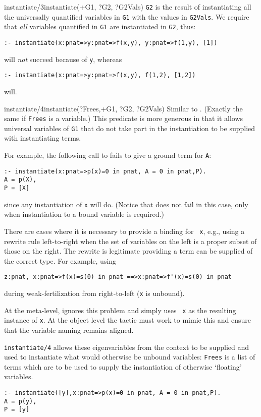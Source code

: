 \begin{predicate}{instantiate/3}{instantiate(+G1, ?G2, ?G2Vals)}%
{\tt G2} is the result of instantiating all the universally quantified
variables in {\tt G1} with the values in {\tt G2Vals}.  We require
that {\em all\/} variables quantified in {\tt G1} are instantiated in
{\tt G2}, thus:
\begin{verbatim}
:- instantiate(x:pnat=>y:pnat=>f(x,y), y:pnat=>f(1,y), [1])
\end{verbatim}
will {\em not\/} succeed because of {\tt y}, whereas
\begin{verbatim}
:- instantiate(x:pnat=>y:pnat=>f(x,y), f(1,2), [1,2])
\end{verbatim}
will.
\end{predicate}

\begin{predicate}{instantiate/4}{instantiate(?Frees,+G1, ?G2, ?G2Vals)}%
Similar to .  (Exactly the same if {\tt Frees} is a
variable.)   This predicate is more generous in that it allows
universal variables of {\tt G1} that do not take part in the
instantiation to be supplied with instantiating terms.  

For example, the following call to  fails to give a
ground term for {\tt A}:
\begin{verbatim}
:- instantiate(x:pnat=>p(x)=0 in pnat, A = 0 in pnat,P).
A = p(X),
P = [X]
\end{verbatim}
since any instantiation of {\tt x} will do.  (Notice that
 does not fail in this case, only when instantiation
to a bound variable is required.)

There are cases where it is necessary to provide a binding for {\tt
x}, e.g., using a rewrite rule left-to-right when the set of variables
on the left is a proper subset of those on the right.  The rewrite is
legitimate providing a term can be supplied of the correct type.  For
example, using

\begin{verbatim}
z:pnat, x:pnat=>f(x)=s(0) in pnat ==>x:pnat=>f'(x)=s(0) in pnat
\end{verbatim}
during weak-fertilization from right-to-left ({\tt x} is unbound).

At the meta-level, \clam{} ignores this problem and simply uses {\tt
x} as the resulting instance of {\tt x}.  At the object level the
tactic must work to mimic this and ensure that the variable naming
remains aligned.  

{\tt instantiate/4} allows these eigenvariables from the context to be
supplied and used to instantiate what would otherwise be unbound
variables: {\tt Frees} is a list of terms which are to be used to
supply the instantiation of otherwise `floating' variables.
\begin{verbatim}
:- instantiate([y],x:pnat=>p(x)=0 in pnat, A = 0 in pnat,P).
A = p(y),
P = [y]
\end{verbatim}


\end{predicate}
